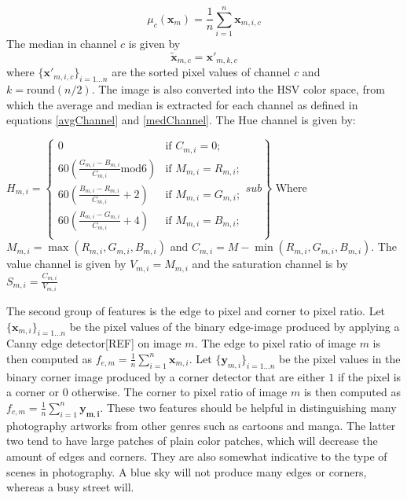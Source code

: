 \begin{equation}
\label{avgChannel}
\mu_c(\mathbf{x}_{m}) = \frac{1}{n}\sum_{i=1}^{n} \mathbf{x}_{m,i,c} 
\end{equation}
The median in channel $c$ is given by 
\begin{equation}
\label{medChannel}
\tilde{\mathbf{x}}_{m,c} = \mathbf{x'}_{m,k,c}
\end{equation}
where $\{\mathbf{x'}_{m,i,c}\}_{i = 1\dots n}$ are the sorted pixel values of channel $c$ and $k = \mbox{round}(n/2)$.
The image is also converted into the HSV color space, from which the average and median is extracted for each channel as defined in equations \ref{avgChannel} and \ref{medChannel}. The Hue channel is given by: 

$H_{m,i} = \left\{ 
\begin{array}{ll}
0 & \mbox{if $C_{m,i} = 0$};\\
60 \left(\frac{G_{m,i}-B_{m,i}}{C_{m,i}} \mbox{mod} 6 \right) & \mbox{if $M_{m,i} = R_{m,i}$};\\
60 \left(\frac{B_{m,i}-R_{m,i}}{C_{m,i}} + 2 \right) & \mbox{if $M_{m,i} = G_{m,i}$};\\
60 \left(\frac{R_{m,i}-G_{m,i}}{C_{m,i}} + 4 \right) & \mbox{if $M_{m,i} = B_{m,i}$}; \\
\end{array} sub
\right\}$
Where $M_{m,i} = \max(R_{m,i},G_{m,i},B_{m,i})$ and $C_{m,i} =  M - \min(R_{m,i},G_{m,i},B_{m,i})$. The value channel is given by $V_{m,i} =  M_{m,i}$ and the saturation channel is  by $S_{m,i} = \frac{C_{m,i}}{V_{m,i}}$

The second group of features is the edge to pixel and corner to pixel ratio. Let $\{\mathbf{x}_{m,i} \}_{i=1\dots n}$ be the pixel values of the binary edge-image produced by applying a Canny edge detector[REF] on image $m$. The edge to pixel ratio of image $m$ is then computed as $f_{e,m} = \frac{1}{n}\sum_{i=1}^{n} \mathbf{x}_{m,i} $. Let $\{\mathbf{y}_{m,i} \}_{i=1\dots n}$ be the pixel values in the binary corner image produced by a corner detector that are either $1$ if the pixel is a corner or $0$ otherwise. The corner to pixel ratio of image $m$ is then computed as  $f_{c,m} = \frac{1}{n}\sum_{i=1}^{n} \mathbf{y_{m,i}} $. These two features should be helpful in distinguishing many photography artworks from other genres such as cartoons and manga. The latter two tend to have large patches of plain color patches, which will decrease the amount of edges and corners. They are also somewhat indicative to the type of scenes in photography. A blue sky will not produce many edges or corners, whereas a busy street will.  

